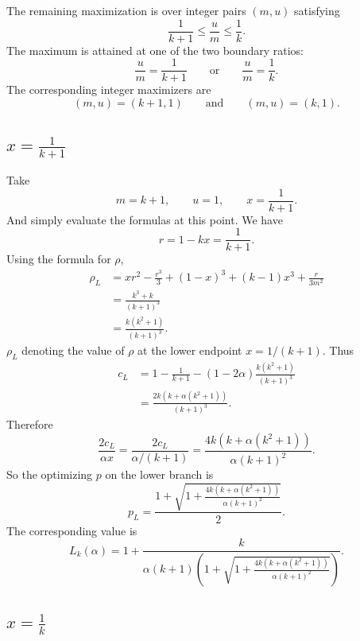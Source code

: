 \documentclass[11pt]{article}
\begin{document}
The remaining maximization is over integer pairs \((m,u)\) satisfying
\[
        \frac{1}{k+1}\leq \frac um\leq \frac1k.
\]
The maximum is attained at one of the two boundary ratios:
\[
        \frac um=\frac{1}{k+1}
        \qquad\text{or}\qquad
        \frac um=\frac1k.
\]
The corresponding integer maximizers are
\[
        (m,u)=(k+1,1)
        \qquad\text{and}\qquad
        (m,u)=(k,1).
\]

\subsection{\(x=\frac{1}{k+1}\)}

Take
\[
        m=k+1,\qquad u=1,\qquad x=\frac{1}{k+1}.
\]
And simply evaluate the formulas at this point. We have
\[
        r=1-kx=\frac{1}{k+1}.
\]
Using the formula for \(\rho\),
\[
\begin{aligned}
\rho_L
&=
xr^2-\frac{r^3}{3}
 +(1-x)^3
 +(k-1)x^3
 +\frac{r}{3m^2} \\
&=
\frac{k^3+k}{(k+1)^3} \\
&=
\frac{k(k^2+1)}{(k+1)^3}.
\end{aligned}
\]
$\rho_L$ denoting the value of \(\rho\) at the lower endpoint \(x=1/(k+1)\).
Thus
\[
\begin{aligned}
c_L
&=
1-\frac{1}{k+1}
-(1-2\alpha)\frac{k(k^2+1)}{(k+1)^3} \\
&=
\frac{2k\left(k+\alpha(k^2+1)\right)}{(k+1)^3}.
\end{aligned}
\]
Therefore
\[
\frac{2c_L}{\alpha x}
=
\frac{2c_L}{\alpha/(k+1)}
=
\frac{4k\left(k+\alpha(k^2+1)\right)}{\alpha(k+1)^2}.
\]
So the optimizing \(p\) on the lower branch is
\[
\boxed{
p_L
=
\frac{
1+\sqrt{
1+\frac{4k\left(k+\alpha(k^2+1)\right)}{\alpha(k+1)^2}
}
}{2}
}.
\]
The corresponding value is
\[
\boxed{
L_k(\alpha)
=
1+
\frac{k}{
\alpha(k+1)\left(
1+\sqrt{
1+\frac{4k\left(k+\alpha(k^2+1)\right)}{\alpha(k+1)^2}
}
\right)}
}.
\]

\subsection{\(x=\frac{1}{k}\)}
\end{document}
